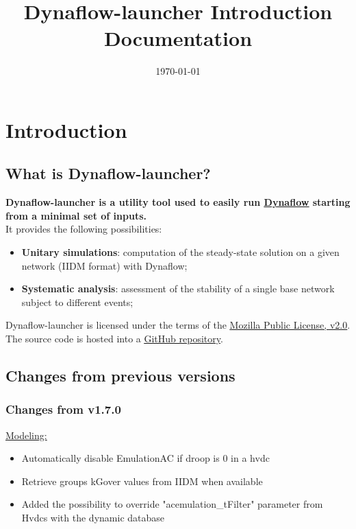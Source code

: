 \documentclass[a4paper, 12pt]{report}
\begin{document}
\title{Dynaflow-launcher Introduction Documentation}
\date\today

\maketitle
\tableofcontents

\chapter{Introduction}

\section{What is Dynaflow-launcher?}

\textbf{Dynaflow-launcher is a utility tool used to easily run \href{https://dynawo.github.io/tools/dynaflow}{\underline{Dynaflow}}
starting from a minimal set of inputs.} \\

It provides the following possibilities:
\begin{itemize}
  \item \textbf{Unitary simulations}: computation of the steady-state solution on a given network (IIDM format) with Dynaflow;
  \item \textbf{Systematic analysis}: assessment of the stability of a single base network subject to different events;
\end{itemize}

Dynaflow-launcher is licensed under the terms of the \href{http://mozilla.org/MPL/2.0}{\underline{Mozilla Public License, v2.0}}.
The source code is hosted into a \href{https://github.com/dynawo/dynaflow-launcher} {\underline{GitHub repository}}. \\

\section{Changes from previous versions}
\subsection{Changes from v1.7.0}
\underline{Modeling:}
\begin{itemize}
\item Automatically disable EmulationAC if droop is 0 in a hvdc
\item Retrieve groups kGover values from IIDM when available
\item Added the possibility to override "acemulation\_tFilter" parameter from Hvdcs with the dynamic database
\end{itemize}
\end{document}
